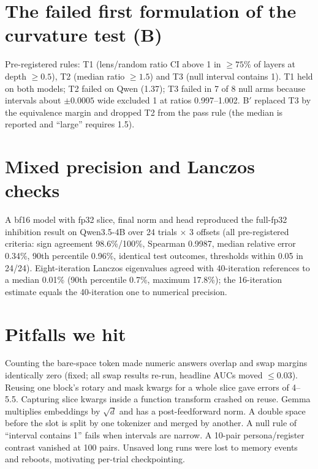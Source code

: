 \documentclass[10pt]{article}
\begin{document}
\section{The failed first formulation of the curvature test (B)}
\label{app:b}
Pre-registered rules: T1 (lens/random ratio CI above 1 in $\ge75\%$ of layers at depth $\ge0.5$), T2 (median ratio $\ge1.5$) and T3 (null interval contains 1). T1 held on both models; T2 failed on Qwen (1.37); T3 failed in 7 of 8 null arms because intervals about $\pm0.0005$ wide excluded 1 at ratios 0.997--1.002. B$'$ replaced T3 by the equivalence margin and dropped T2 from the pass rule (the median is reported and ``large'' requires 1.5).

\section{Mixed precision and Lanczos checks}
A bf16 model with fp32 slice, final norm and head reproduced the full-fp32 inhibition result on Qwen3.5-4B over 24 trials $\times$ 3 offsets (all pre-registered criteria: sign agreement 98.6\%/100\%, Spearman 0.9987, median relative error 0.34\%, 90th percentile 0.96\%, identical test outcomes, thresholds within 0.05 in 24/24). Eight-iteration Lanczos eigenvalues agreed with 40-iteration references to a median 0.01\% (90th percentile 0.7\%, maximum 17.8\%); the 16-iteration estimate equals the 40-iteration one to numerical precision.

\section{Pitfalls we hit}
Counting the bare-space token made numeric answers overlap and swap margins identically zero (fixed; all swap results re-run, headline AUCs moved $\le0.03$). Reusing one block's rotary and mask kwargs for a whole slice gave errors of 4--5.5. Capturing slice kwargs inside a function transform crashed on reuse. Gemma multiplies embeddings by $\sqrt d$ and has a post-feedforward norm. A double space before the slot is split by one tokenizer and merged by another. A null rule of ``interval contains 1'' fails when intervals are narrow. A 10-pair persona/register contrast vanished at 100 pairs. Unsaved long runs were lost to memory events and reboots, motivating per-trial checkpointing.
\end{document}
